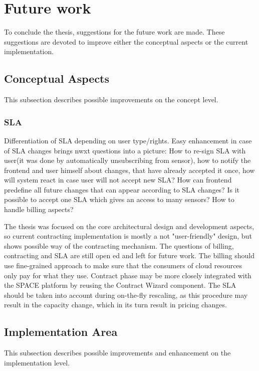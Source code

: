  \section{Future work}
	To conclude the thesis, suggestions for the future work are made. These suggestions are devoted to improve either the conceptual aspects or the current implementation.

\subsection{Conceptual Aspects}
	This subsection describes possible improvements on the concept level.
		\subsubsection {SLA}
		Differentiation of SLA depending on user type/rights. Easy enhancement in case of SLA changes brings nwxt questions into a picture: How to re-sign SLA with user(it was done by automatically unsubscribing from sensor), how to notify the frontend and user himself about changes, that have already accepted it once, how will system react in case user will not accept new SLA? How can frontend predefine all future changes that can appear according to SLA changes? Is it possible to accept one SLA which gives an access to many sensors? How to handle billing aspects?

		The thesis was focused on the core architectural design and development aspects, so current contracting implementation is mostly a not "user-friendly" design, but shows possible way of the contracting mechanism. The questions of billing, contracting and SLA are still open ed and left for future work. The billing should use fine-grained approach to make sure that the consumers of cloud resources only pay for what they use. Contract phase may be more closely integrated with the SPACE platform by reusing the Contract Wizard component. The SLA should be taken into account during on-the-fly rescaling, as this procedure may result in the capacity change, which in its turn result in pricing changes. 

	\subsection{Implementation Area}
    This subsection describes possible improvements and enhancement on the implementation level.

